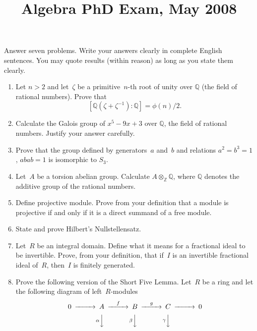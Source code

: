 \documentclass[11pt,letterpaper]{article}
\title{Algebra PhD Exam, May 2008}
\author{}
\date{}
\newenvironment{examproblems}[2]{%
  \def\ProblemHeadingTag{#2}%
  \AssignTaggingSocketPlug{block/list/label}{examproblem}%
  \begin{enumerate}%
  \setcounter{enumi}{#1}%
  \renewcommand{\labelenumi}{\textbf{\theenumi.}}%
  \setlength{\topsep}{0.35em}%
  \setlength{\partopsep}{0pt}%
  \setlength{\itemsep}{0.48em}%
  \setlength{\parsep}{0.18em}%
}{\end{enumerate}}
\newenvironment{examinstructions}{%
  \par\begingroup\itshape
}{%
  \par\endgroup\vspace{0.18em}
}
\begin{document}
\maketitle
\thispagestyle{empty}
\begin{examinstructions}
Answer seven problems. Write your answers clearly in complete English sentences. You may quote results (within reason) as long as you state them clearly.
\end{examinstructions}
\begin{examproblems}{0}{H2}
\def\ProblemHeadingText{Problem 1.}
\item
Let \(n>2\) and let~\(\zeta\) be a primitive~\(n\)-th root of unity over \(\mathbb Q\) (the field of rational numbers). Prove that
\[
[\mathbb Q(\zeta+\zeta^{-1}):\mathbb Q]=\phi(n)/2.
\]
\def\ProblemHeadingText{Problem 2.}
\item
Calculate the Galois group of \(x^5-9x+3\) over \(\mathbb Q\), the field of rational numbers. Justify your answer carefully.
\def\ProblemHeadingText{Problem 3.}
\item
Prove that the group defined by generators~\(a\) and~\(b\) and relations \(a^2=b^3=1\), \(abab=1\) is isomorphic to \(S_3\).
\def\ProblemHeadingText{Problem 4.}
\item
Let~\(A\) be a torsion abelian group. Calculate \(A\otimes_{\mathbb Z}\mathbb Q\), where \(\mathbb Q\) denotes the additive group of the rational numbers.
\def\ProblemHeadingText{Problem 5.}
\item
Define projective module. Prove from your definition that a module is projective if and only if it is a direct summand of a free module.
\def\ProblemHeadingText{Problem 6.}
\item
State and prove Hilbert’s Nullstellensatz.
\def\ProblemHeadingText{Problem 7.}
\item
Let~\(R\) be an integral domain. Define what it means for a fractional ideal to be invertible. Prove, from your definition, that if~\(I\) is an invertible fractional ideal of~\(R\), then~\(I\) is finitely generated.
\def\ProblemHeadingText{Problem 8.}
\item
Prove the following version of the Short Five Lemma. Let~\(R\) be a ring and let the following diagram of left~\(R\)-modules
{
\[
\begin{CD}
0 @>>> A @>{f}>> B @>{g}>> C @>>> 0 \\
@. @V{\alpha}VV @V{\beta}VV @V{\gamma}VV @. \\

\end{CD}\]}
\end{examproblems}
\end{document}
